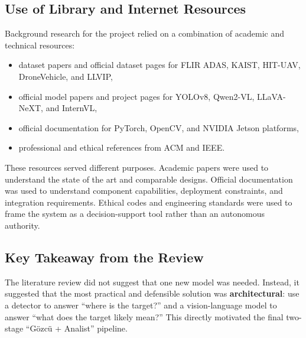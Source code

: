 \subsection{Use of Library and Internet Resources}

Background research for the project relied on a combination of academic and technical
resources:

\begin{itemize}[nosep]
  \item dataset papers and official dataset pages for FLIR ADAS, KAIST, HIT-UAV,
    DroneVehicle, and LLVIP,
  \item official model papers and project pages for YOLOv8, Qwen2-VL, LLaVA-NeXT,
    and InternVL,
  \item official documentation for PyTorch, OpenCV, and NVIDIA Jetson platforms,
  \item professional and ethical references from ACM and IEEE.
\end{itemize}

These resources served different purposes. Academic papers were used to understand the
state of the art and comparable designs. Official documentation was used to understand
component capabilities, deployment constraints, and integration requirements. Ethical codes
and engineering standards were used to frame the system as a decision-support tool rather
than an autonomous authority.

\subsection{Key Takeaway from the Review}

The literature review did not suggest that one new model was needed. Instead, it suggested
that the most practical and defensible solution was \textbf{architectural}: use a detector to
answer ``where is the target?'' and a vision-language model to answer ``what does the target
likely mean?'' This directly motivated the final two-stage ``Gözcü + Analist'' pipeline.
